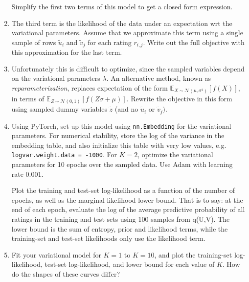 \documentclass{harvardml}
\theoremstyle{plain}
\begin{document}
\begin{problem}
\begin{enumerate}
Simplify the first two terms of this model to get a closed form expression.


\item The third term is the likelihood of the data under an expectation wrt the variational parameters.
  Assume that we approximate this term using a single sample of rows $\tilde{u}_{i}$  and $\tilde{v}_{j}$
  for each rating $r_{i,j}$. Write out the full objective with this approximation for the last term.

\item  Unfortunately this is difficult to optimize, since the sampled variables 
depend on the variational parameters $\lambda$. An alternative method, known as 
\textit{reparameterization}, replaces expectation of the form 
$\mathbb{E}_{X \sim \mathcal{N}(\mu, \sigma^2)}[f(X)]$, in terms of 
$\mathbb{E}_{Z \sim \mathcal{N}(0, 1)}[f(Z \sigma + \mu)]$. Rewrite the 
objective in this form using sampled dummy variables $\tilde{z}$ 
(and no $\tilde{u}_{i}$  or $\tilde{v}_{j})$.

\item Using PyTorch, set up this model using \texttt{nn.Embedding} for the variational parameters. For numerical stability, store the log of the variance in
  the embedding table, and also initialize this table with very low values, e.g. \texttt{logvar.weight.data = -1000}. 
  For $K = 2$, optimize the variational parameters for 10 epochs over the sampled data.  Use Adam with learning rate 0.001.

Plot the training and test-set log-likelihood as a function of the number of epochs, as well as the marginal likelihood lower bound.
That is to say: at the end of each epoch, evaluate the log of the average predictive probability of all ratings in the training and test sets using 100 samples from q(U,V).
The lower bound is the sum of entropy, prior and likelihood terms, while the training-set and test-set likelihoods only use the likelihood term.

\item Fit your variational model for $K = 1$ to $K = 10$, and plot the training-set log-likelihood, test-set log-likelihood, and lower bound for each value of $K$.
How do the shapes of these curves differ?



\end{enumerate}
\end{problem}
\end{document}

